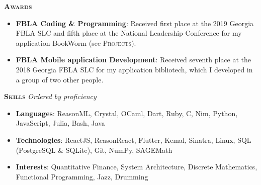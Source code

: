 \documentclass{article}
\begin{document}
  \vspace{10pt}

  {\large \textbf{\textsc{Awards}}}\hspace{5pt}\xrfill[.5ex]{.4pt}

  \vspace{3pt}

  \begin{itemize}
    \item \textbf{FBLA Coding \& Programming}: Received first place at the 2019 Georgia FBLA SLC and fifth place at the National Leadership Conference for my application BookWorm (see \textsc{Projects}).
    \item \textbf{FBLA Mobile application Development}: Received seventh place at the 2018 Georgia FBLA SLC for my application bibliotech, which I developed in a group of two other people.
  \end{itemize}

  \vspace{10pt}

  {\large \textbf{\textsc{Skills}}} {\footnotesize \textit{Ordered by proficiency}}\hspace{5pt}\xrfill[.5ex]{.4pt}

  \vspace{3pt}

  \begin{itemize}
    \item \textbf{Languages}: ReasonML, Crystal, OCaml, Dart, Ruby, C, Nim, Python, JavaScript, Julia, Bash, Java
    \item \textbf{Technologies}: ReactJS, ReasonReact, Flutter, Kemal, Sinatra, Linux, SQL (PostgreSQL \& SQLite), Git, NumPy, SAGEMath
    \item \textbf{Interests}: Quantitative Finance, System Architecture, Discrete Mathematics, Functional Programming, Jazz, Drumming
  \end{itemize}
\end{document}
